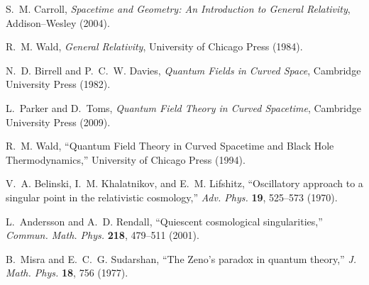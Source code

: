 \documentclass[11pt]{article}
\begin{document}

\begin{thebibliography}{99}

S.~M. Carroll, \emph{Spacetime and Geometry: An Introduction to General Relativity}, Addison–Wesley (2004).

R.~M. Wald, \emph{General Relativity}, University of Chicago Press (1984).

N.~D. Birrell and P.~C.~W. Davies, \emph{Quantum Fields in Curved Space}, Cambridge University Press (1982).

L.~Parker and D.~Toms, \emph{Quantum Field Theory in Curved Spacetime}, Cambridge University Press (2009).

R.~M. Wald, ``Quantum Field Theory in Curved Spacetime and Black Hole Thermodynamics,'' University of Chicago Press (1994).

V.~A. Belinski, I.~M. Khalatnikov, and E.~M. Lifshitz, ``Oscillatory approach to a singular point in the relativistic cosmology,'' \emph{Adv. Phys.} \textbf{19}, 525–573 (1970).

L.~Andersson and A.~D. Rendall, ``Quiescent cosmological singularities,'' \emph{Commun. Math. Phys.} \textbf{218}, 479–511 (2001).

B.~Misra and E.~C.~G. Sudarshan, ``The Zeno’s paradox in quantum theory,'' \emph{J. Math. Phys.} \textbf{18}, 756 (1977).

\end{thebibliography}
\end{document}
